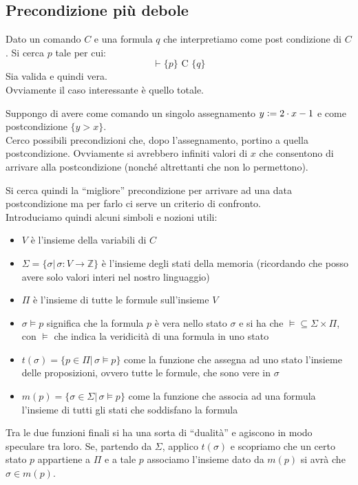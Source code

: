 \documentclass[a4paper,12pt, oneside]{book}
\def\cceq{\mathrel{\vcenter{\hbox{:}}{=}}}
\begin{document}
\subsection{Precondizione più debole}
Dato un comando $C$ e una formula $q$ che interpretiamo come post condizione di
$C$. Si cerca $p$ tale per cui:
\[\vdash\{p\}\mbox{ C } \{q\}\]
Sia valida e quindi vera.\\
Ovviamente il caso interessante è quello totale.
\begin{esempio}
  Suppongo di avere come comando un singolo assegnamento $y\cceq 2\cdot x-1$ e
  come postcondizione $\{y>x\}$.\\
  Cerco possibili precondizioni che, dopo l'assegnamento, portino a quella
  postcondizione. Ovviamente si avrebbero infiniti valori di $x$ che consentono
  di arrivare alla postcondizione (nonché altrettanti che non lo permettono). 
\end{esempio}
Si cerca quindi la ``migliore'' precondizione per arrivare ad una data
postcondizione ma per farlo ci serve un criterio di confronto. \\
Introduciamo quindi alcuni simboli e nozioni utili:
\begin{itemize}
  \item $V$ è l'insieme della variabili di $C$
  \item $\Sigma=\{\sigma|\,\sigma:V\to\mathbb{Z}\}$ è l'insieme degli stati
  della memoria (ricordando che posso avere solo valori interi nel nostro
  linguaggio)
  \item $\Pi$ è l'insieme di tutte le formule sull'insieme $V$
  \item $\sigma \vDash p$ significa che la formula $p$ è vera nello stato
  $\sigma$ e si ha che $\vDash\subseteq\Sigma\times \Pi$, con $\vDash$ che
  indica la veridicità di una formula in uno stato
  \item $t(\sigma)=\{p\in \Pi|\,\sigma\vDash p\}$ come la funzione che assegna
  ad uno stato l'insieme delle proposizioni, ovvero tutte le formule, che sono
  vere in $\sigma$
  \item $m(p)=\{\sigma\in \Sigma|\,\sigma\vDash p\}$ come la funzione che
  associa ad una formula l'insieme di tutti gli stati che soddisfano la formula
\end{itemize}
Tra le due funzioni finali si ha una sorta di ``dualità'' e agiscono in modo
speculare tra loro. Se, partendo da $\Sigma$, applico $t(\sigma)$ e scopriamo
che un certo stato $p$ appartiene a $\Pi$ e a tale $p$ associamo l'insieme dato
da $m(p)$ si avrà che $\sigma\in m(p)$.\\
\end{document}
